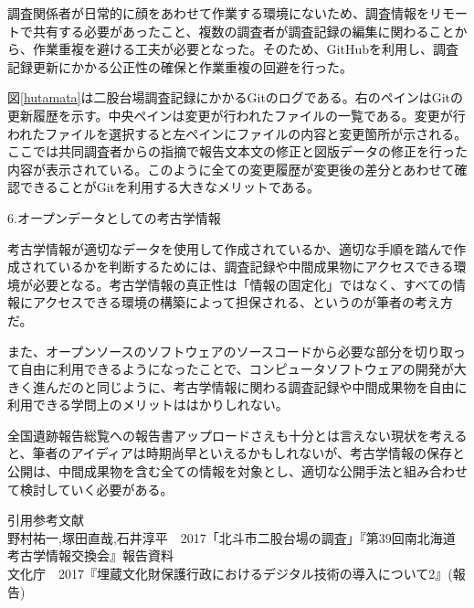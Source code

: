 \documentclass[9pt,b5j,papersize]{jsarticle}
\begin{document}
\begin{multicols}{2}
調査関係者が日常的に顔をあわせて作業する環境にないため、調査情報をリモートで共有する必要があったこと、複数の調査者が調査記録の編集に関わることから、作業重複を避ける工夫が必要となった。そのため、GitHubを利用し、調査記録更新にかかる公正性の確保と作業重複の回避を行った。

図\ref{hutamata}は二股台場調査記録にかかるGitのログである。右のペインはGitの更新履歴を示す。中央ペインは変更が行われたファイルの一覧である。変更が行われたファイルを選択すると左ペインにファイルの内容と変更箇所が示される。ここでは共同調査者からの指摘で報告文本文の修正と図版データの修正を行った内容が表示されている。このように全ての変更履歴が変更後の差分とあわせて確認できることがGitを利用する大きなメリットである。

\noindent
{\large 6.オープンデータとしての考古学情報}

考古学情報が適切なデータを使用して作成されているか、適切な手順を踏んで作成されているかを判断するためには、調査記録や中間成果物にアクセスできる環境が必要となる。考古学情報の真正性は「情報の固定化」ではなく、すべての情報にアクセスできる環境の構築によって担保される、というのが筆者の考え方だ。

また、オープンソースのソフトウェアのソースコードから必要な部分を切り取って自由に利用できるようになったことで、コンピュータソフトウェアの開発が大きく進んだのと同じように、考古学情報に関わる調査記録や中間成果物を自由に利用できる学問上のメリットははかりしれない。

全国遺跡報告総覧への報告書アップロードさえも十分とは言えない現状を考えると、筆者のアイディアは時期尚早といえるかもしれないが、考古学情報の保存と公開は、中間成果物を含む全ての情報を対象とし、適切な公開手法と組み合わせて検討していく必要がある。

\vspace{1\baselineskip}
\noindent
引用参考文献\\
野村祐一,塚田直哉,石井淳平　2017「北斗市二股台場の調査」『第39回南北海道考古学情報交換会』報告資料\\
文化庁　2017『埋蔵文化財保護行政におけるデジタル技術の導入について2』(報告)\\

\end{multicols}
\end{document}
